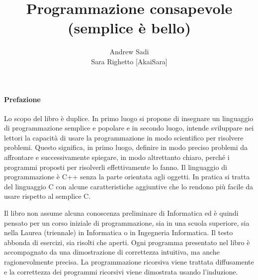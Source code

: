 \documentclass[a4paper,12pt]{book}
\begin{document}
\author{Andrew Sadi \\ Sara Righetto [AkaiSara]}
\title{Programmazione consapevole \\ (semplice è bello)}
\maketitle

\tableofcontents

\newpage

\paragraph{Prefazione}
Lo scopo del libro è duplice.
In primo luogo si propone di insegnare un linguaggio di programmazione semplice e popolare e in secondo luogo, intende sviluppare nei lettori la capacità di usare la programmazione in modo scientifico per risolvere problemi.
Questo significa, in primo luogo, definire in modo preciso  problemi da affrontare e successivamente spiegare, in modo altrettanto chiaro, perché i programmi proposti per risolverli effettivamente lo fanno.
Il linguaggio di programmazione è C++ senza la parte orientata agli oggetti.
In pratica si tratta del linguaggio C con alcune caratteristiche aggiuntive che lo rendono più facile da usare rispetto al semplice C.

Il libro non assume alcuna conoscenza preliminare di Informatica ed è quindi pensato per un corso iniziale di programmazione, sia in una scuola superiore, sia nella Laurea (triennale) in Informatica o in Ingegneria Informatica.
Il testo abbonda di esercizi, sia risolti che aperti. Ogni programma presentato nel libro è accompagnato da una dimostrazione di correttezza intuitiva, ma anche ragionevolmente precisa.
La programmazione ricorsiva viene trattata diffusamente e la correttezza dei programmi ricorsivi viene dimostrata usando l'induzione.

























\end{document}
